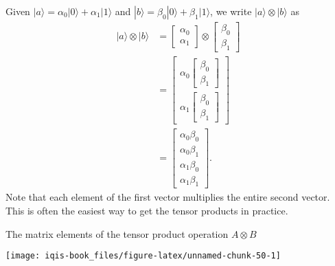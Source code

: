\documentclass[fleqn]{article}
\begin{document}
Given \(|a\rangle = \alpha_0|0\rangle + \alpha_1|1\rangle\) and \(|b\rangle = \beta_0|0\rangle +\beta_1|1\rangle\), we write \(|a\rangle\otimes|b\rangle\) as
\[
  \begin{aligned}
    |a\rangle\otimes|b\rangle
    &= \begin{bmatrix}\alpha_0\\\alpha_1\end{bmatrix} \otimes \begin{bmatrix}\beta_0\\\beta_1\end{bmatrix}
  \\&= \begin{bmatrix}\alpha_0\begin{bmatrix}\beta_0\\\beta_1\end{bmatrix}\\\alpha_1\begin{bmatrix}\beta_0\\\beta_1\end{bmatrix}\end{bmatrix}
  \\&= \begin{bmatrix}\alpha_0\beta_0\\\alpha_0\beta_1\\\alpha_1\beta_0\\\alpha_1\beta_1\end{bmatrix}.
  \end{aligned}
\]
Note that each element of the first vector multiplies the entire second vector.
This is often the easiest way to get the tensor products in practice.

The matrix elements of the tensor product operation \(A\otimes B\)

\begin{center}\texttt{[image: iqis-book\_files/figure-latex/unnamed-chunk-50-1]} \end{center}
\end{document}
